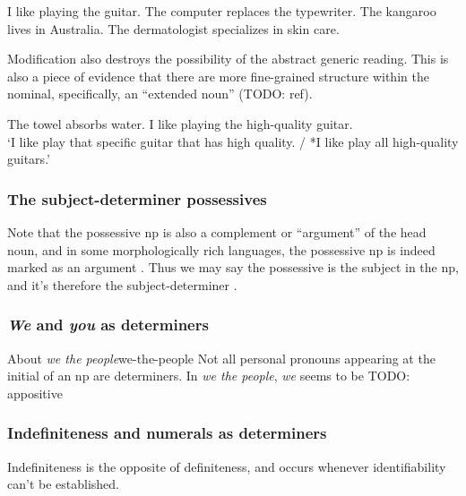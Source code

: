 \documentclass[UTF8, a4paper, oneside, scheme=plain]{ctexrep}
\newcommand*{\citesec}[1]{\S~{#1}}
\newcommand*{\citepage}[1]{p.~{#1}}
\newcommand{\corpus}[1]{\emph{#1}}
\newcommand{\translate}[1]{`#1'}
\begin{document}
\begin{exe}
    \ex I like playing the guitar.
    \ex The computer replaces the typewriter.
    \ex The kangaroo lives in Australia.
    \ex The dermatologist specializes in skin care.
\end{exe}

Modification also destroys the possibility of the abstract generic reading.
This is also a piece of evidence that 
there are more fine-grained structure within the nominal,
specifically, an ``extended noun'' (TODO: ref).

\begin{exe}
    \ex *The towel absorbs water.
    \ex I like playing the high-quality guitar. \\
    \translate{I like play that specific guitar that has high quality.
    / *I like play all high-quality guitars.}
\end{exe}

\subsubsection{The subject-determiner possessives}

Note that the possessive \acs{np} is also a complement or ``argument''
of the head noun,
and in some morphologically rich languages,
the possessive \acs{np} is indeed marked as an argument 
\citep[\citesec{5.1.2.1}]{jacques2021grammar}.
Thus we may say the possessive is the subject in the \acs{np},
and it's therefore the subject-determiner \citep[\citepage{467}]{cgel}.

\subsubsection{\corpus{We} and \corpus{you} as determiners}

\begin{infobox}{About \corpus{we the people}}{we-the-people}
    Not all personal pronouns appearing at the initial of an \acs{np}
    are determiners.
    In \corpus{we the people}, 
    \corpus{we} seems to be TODO: appositive
\end{infobox}

\subsubsection{Indefiniteness and numerals as determiners}

Indefiniteness is the opposite of definiteness,
and occurs whenever identifiability can't be established.
\end{document}
